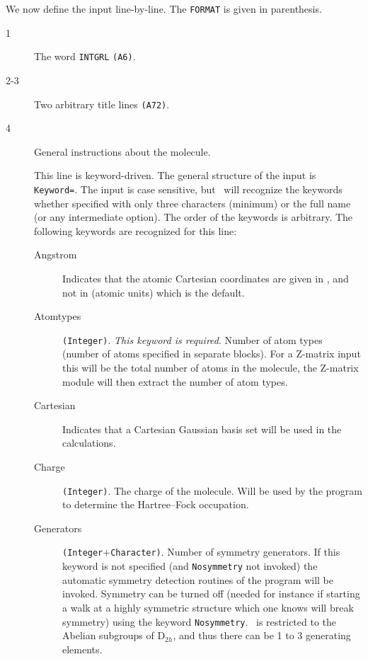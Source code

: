 We now define the input line-by-line.  The {\tt FORMAT} is given
in parenthesis.
\begin{description}
\item[1] The word \verb|INTGRL| {\tt (A6)}.
\item[2-3] Two arbitrary title lines {\tt (A72)}.
\item[4] General instructions about the molecule.

This line is keyword-driven. The general structure of the input is
\verb|Keyword=|. The input is case sensitive, but \dalton\ will recognize
the keywords whether specified with only three characters (minimum) or
the full name (or any intermediate option). The order of the keywords
is arbitrary. The following keywords are recognized for this line:
\begin{description}
\item[Angstrom] Indicates that the atomic Cartesian coordinates are
  given in \angstrom{}, and not in \bohr{} (atomic units) which is
  the default.
\item[Atomtypes] \verb|(Integer)|. {\em This keyword is
  required\/}. Number of atom types (number of atoms specified 
in separate blocks). For a Z-matrix input this will be the total
number of atoms in the molecule, the Z-matrix module will then
extract the number of atom types.
\item[Cartesian] Indicates that a Cartesian Gaussian basis set will be
  used in the calculations.
\item[Charge] \verb|(Integer)|. The charge of the molecule. Will be used  by the program to determine the Hartree--Fock
occupation.
\item[Generators] \verb|(Integer|+\verb|Character)|. Number of symmetry
  generators. If this keyword is not
  specified (and \verb|Nosymmetry| not invoked)
  the automatic symmetry detection routines of the program will be
invoked. Symmetry can be turned off (needed for instance if starting a
walk at a highly symmetric structure which one knows will break
symmetry) using the keyword \verb|Nosymmetry|. \dalton\ is restricted
  to the Abelian subgroups of D$_{2h}$, and thus there can be 1 to 3
  generating elements.


\end{description}
\end{description}
